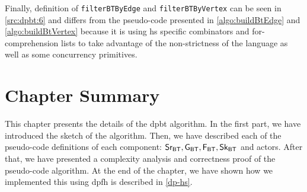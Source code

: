Finally, definition of \texttt{filterBTByEdge} and \texttt{filterBTByVertex} can be seen in \autoref{src:dpbt:6} and differs 
from the pseudo-code presented in \autoref{algo:buildBtEdge} and \autoref{algo:buildBtVertex} because it is using \acrshort{hs} specific combinators and 
for-comprehension lists to take advantage of the non-strictness of the language as well as some concurrency primitives.

\section{Chapter Summary}
This chapter presents the details of the \acrshort{dpbt} algorithm. In the first part, we have introduced the sketch of the algorithm.
Then, we have described each of the pseudo-code definitions of each component: $\mathsf{Sr_{BT}}, \mathsf{G_{BT}}, \mathsf{F_{BT}}, \mathsf{Sk_{BT}}$ and actors. 
After that, we have presented a complexity analysis and correctness proof of the pseudo-code algorithm.
At the end of the chapter, we have shown how we implemented this using \acrshort{dpfh} is described in \autoref{dp-hs}.

